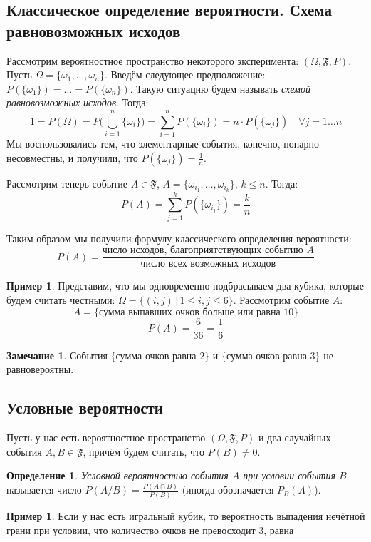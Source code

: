 \documentclass[11pt,openany,a4paper]{scrartcl}
\theoremstyle{plain}
\theoremstyle{definition}
\newtheorem{definition}[theorem]{Определение}
\newtheorem{remark}[theorem]{Замечание}
\newtheorem{example}[theorem]{Пример}
\begin{document}
\subsection{Классическое определение вероятности. Схема равновозможных исходов}

Рассмотрим вероятностное пространство некоторого эксперимента: $(\Omega, \mathfrak F, P)$.
Пусть $\Omega = \{\omega_1, \ldots, \omega_n\}$. Введём следующее предположение:
$P(\{\omega_1\}) = \ldots = P(\{\omega_n\})$. Такую ситуацию будем называть
\emph{схемой равновозможных исходов}. Тогда:
$$
1 = P(\Omega) = P\bigg(\bigcup\limits_{i=1}^n \{\omega_i\}\bigg) =
\sum\limits_{i=1}^n P(\{\omega_i\}) = n \cdot P(\{\omega_j\})\quad \forall j=1\ldots n
$$
Мы воспользовались тем, что элементарные события, конечно, попарно несовместны,
и получили, что $P(\{\omega_j\}) = \frac{1}{n}$.

Рассмотрим теперь событие $A \in \mathfrak F$, $A = \{\omega_{i_1}, \ldots, \omega_{i_k}\}$,
$k \leqslant n$. Тогда:
$$
P(A) = \sum\limits_{j=1}^k P(\{\omega_{i_j}\}) = \frac{k}{n}
$$

Таким образом мы получили формулу классического определения вероятности:
$$
P(A) = \frac{\text{число исходов, благоприятствующих событию } A}
{\text{число всех возможных исходов}}
$$

\begin{example}
    Представим, что мы одновременно подбрасываем два кубика, которые будем считать честными:
    $\Omega = \{ (i, j)\,|\, 1 \leqslant i,j \leqslant 6\}$. Рассмотрим событие $A$:
    $$
    A = \{\text{сумма выпавших очков больше или равна }10\}
    $$
    $$
    P(A) = \frac{6}{36} = \frac{1}{6}
    $$
\end{example}
\begin{remark}
    События $\{\text{сумма очков равна } 2\}$ и $\{\text{сумма очков равна } 3\}$ не равновероятны.
\end{remark}

\subsection{Условные вероятности}

Пусть у нас есть вероятностное пространство $(\Omega, \mathfrak{F}, P)$ и два случайных 
события $A,B \in \mathfrak{F}$, причём будем считать, что $P(B) \neq 0$.

\begin{definition}
    \emph{Условной вероятностью события $A$ при условии события $B$} называется число
    $P(A/B) = \frac{P(A \cap B)}{P(B)}$ (иногда обозначается $P_B(A)$).
\end{definition}
\begin{example}
    Если у нас есть игральный кубик, то вероятность выпадения нечётной грани при 
    условии, что количество очков не превосходит $3$, равна
\end{example}
\end{document}
